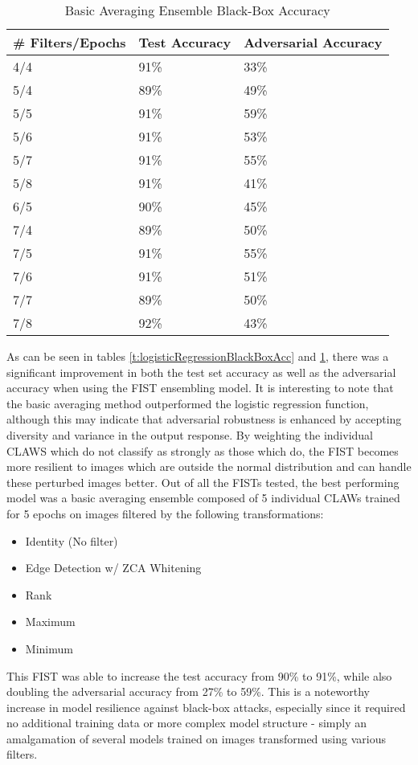 \begin{table}
    \begin{center}
        \caption{Basic Averaging Ensemble Black-Box Accuracy}
        \label{t:basicAveragingBlackBoxAcc}
        \begin{tabular}{l|l|l}\hline
        \textbf{\# Filters/Epochs} & \textbf{Test Accuracy} & \textbf{Adversarial Accuracy}\\\hline
        4/4 & 91\% & 33\% \\\hline
        5/4 & 89\% & 49\% \\\hline
        5/5 & 91\% & 59\% \\\hline
        5/6 & 91\% & 53\% \\\hline
        5/7 & 91\% & 55\% \\\hline
        5/8 & 91\% & 41\% \\\hline
        6/5 & 90\% & 45\% \\\hline
        7/4 & 89\% & 50\% \\\hline
        7/5 & 91\% & 55\% \\\hline
        7/6 & 91\% & 51\% \\\hline
        7/7 & 89\% & 50\% \\\hline
        7/8 & 92\% & 43\% \\\hline
        \end{tabular}
    \end{center}
\end{table}

As can be seen in tables \ref{t:logisticRegressionBlackBoxAcc} and \ref{t:basicAveragingBlackBoxAcc}, there was a significant improvement in both the test set accuracy as well as the adversarial accuracy when using the FIST ensembling model.
It is interesting to note that the basic averaging method outperformed the logistic regression function, although this may indicate that adversarial robustness is enhanced by accepting diversity and variance in the output response.
By weighting the individual CLAWS which do not classify as strongly as those which do, the FIST becomes more resilient to images which are outside the normal distribution and can handle these perturbed images better.
Out of all the FISTs tested, the best performing model was a basic averaging ensemble composed of 5 individual CLAWs trained for 5 epochs on images filtered by the following transformations:

\begin{itemize}
    \item Identity (No filter)
    \item Edge Detection w/ ZCA Whitening
    \item Rank
    \item Maximum
    \item Minimum
\end{itemize}

This FIST was able to increase the test accuracy from 90\% to 91\%, while also doubling the adversarial accuracy from 27\% to 59\%.
This is a noteworthy increase in model resilience against black-box attacks, especially since it required no additional training data or more complex model structure - simply an amalgamation of several models trained on images transformed using various filters.
